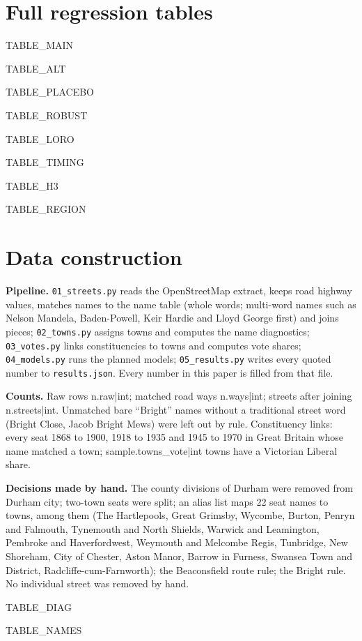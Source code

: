 \documentclass[11pt,a4paper]{article}
\begin{document}
\clearpage
\appendix
\section{Full regression tables}
{{TABLE_MAIN}}

{{TABLE_ALT}}

{{TABLE_PLACEBO}}

{{TABLE_ROBUST}}

{{TABLE_LORO}}

{{TABLE_TIMING}}

{{TABLE_H3}}

{{TABLE_REGION}}

\section{Data construction}
\textbf{Pipeline.} \texttt{01\_streets.py} reads the OpenStreetMap extract, keeps road highway values, matches names to the name table (whole words; multi-word names such as Nelson Mandela, Baden-Powell, Keir Hardie and Lloyd George first) and joins pieces; \texttt{02\_towns.py} assigns towns and computes the name diagnostics; \texttt{03\_votes.py} links constituencies to towns and computes vote shares; \texttt{04\_models.py} runs the planned models; \texttt{05\_results.py} writes every quoted number to \texttt{results.json}. Every number in this paper is filled from that file.

\textbf{Counts.} Raw rows {{n.raw|int}}; matched road ways {{n.ways|int}}; streets after joining {{n.streets|int}}. Unmatched bare ``Bright'' names without a traditional street word (Bright Close, Jacob Bright Mews) were left out by rule. Constituency links: every seat 1868 to 1900, 1918 to 1935 and 1945 to 1970 in Great Britain whose name matched a town; {{sample.towns_vote|int}} towns have a Victorian Liberal share.

\textbf{Decisions made by hand.} The county divisions of Durham were removed from Durham city; two-town seats were split; an alias list maps 22 seat names to towns, among them (The Hartlepools, Great Grimsby, Wycombe, Burton, Penryn and Falmouth, Tynemouth and North Shields, Warwick and Leamington, Pembroke and Haverfordwest, Weymouth and Melcombe Regis, Tunbridge, New Shoreham, City of Chester, Aston Manor, Barrow in Furness, Swansea Town and District, Radcliffe-cum-Farnworth); the Beaconsfield route rule; the Bright rule. No individual street was removed by hand.

{{TABLE_DIAG}}

{{TABLE_NAMES}}
\end{document}
